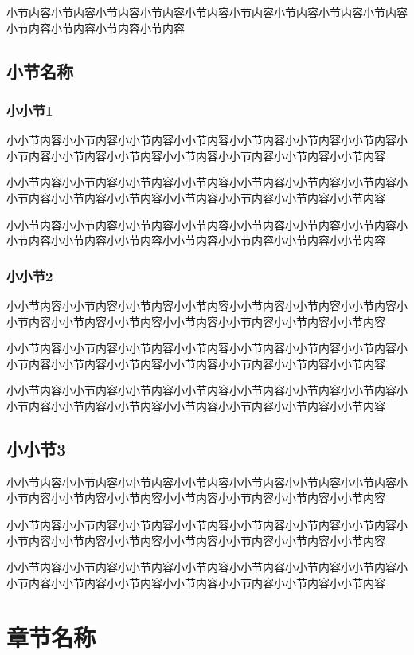 \documentclass[a4paper, 12pt, oneside]{article}
\theoremstyle{cn_theorem}
\begin{document}
小节内容小节内容小节内容小节内容小节内容小节内容小节内容小节内容小节内容小节内容小节内容小节内容小节内容

\subsection{小节名称}

\subsubsection{小小节1}
小小节内容小小节内容小小节内容小小节内容小小节内容小小节内容小小节内容小小节内容小小节内容小小节内容小小节内容小小节内容小小节内容小小节内容

小小节内容小小节内容小小节内容小小节内容小小节内容小小节内容小小节内容小小节内容小小节内容小小节内容小小节内容小小节内容小小节内容小小节内容

小小节内容小小节内容小小节内容小小节内容小小节内容小小节内容小小节内容小小节内容小小节内容小小节内容小小节内容小小节内容小小节内容小小节内容

\subsubsection{小小节2}
小小节内容小小节内容小小节内容小小节内容小小节内容小小节内容小小节内容小小节内容小小节内容小小节内容小小节内容小小节内容小小节内容小小节内容

小小节内容小小节内容小小节内容小小节内容小小节内容小小节内容小小节内容小小节内容小小节内容小小节内容小小节内容小小节内容小小节内容小小节内容

小小节内容小小节内容小小节内容小小节内容小小节内容小小节内容小小节内容小小节内容小小节内容小小节内容小小节内容小小节内容小小节内容小小节内容

\subsection{小小节3}
小小节内容小小节内容小小节内容小小节内容小小节内容小小节内容小小节内容小小节内容小小节内容小小节内容小小节内容小小节内容小小节内容小小节内容

小小节内容小小节内容小小节内容小小节内容小小节内容小小节内容小小节内容小小节内容小小节内容小小节内容小小节内容小小节内容小小节内容小小节内容

小小节内容小小节内容小小节内容小小节内容小小节内容小小节内容小小节内容小小节内容小小节内容小小节内容小小节内容小小节内容小小节内容小小节内容

\section{章节名称}
\end{document}
